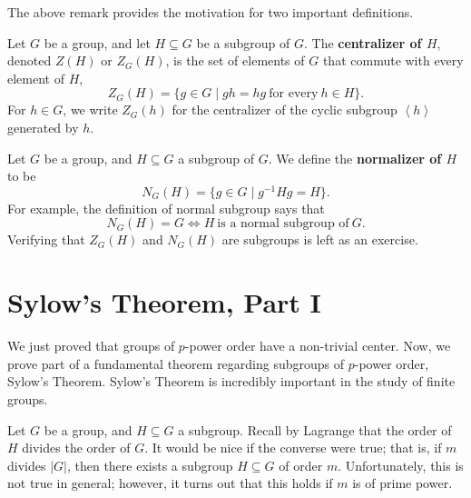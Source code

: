 \documentclass[math1530-lecture-notes]{subfiles}
\begin{document}
The above remark provides the motivation for two important definitions.
\begin{definition}[Centralizer]{}
  Let $G$ be a group, and let $H\subseteq G$ be a subgroup of $G$. The \textbf{centralizer of $H$},
  denoted $Z(H)$ or $Z_G(H)$, is the set of elements of $G$ that commute with every element of $H$,
  \[
    Z_G(H)=\{g\in G\mid gh=hg~\text{for every}~h\in H\} 
  .\] For $h\in G$, we write $Z_G(h)$ for the centralizer of the cyclic subgroup $\left<h \right>$
  generated by $h$.
\end{definition}
\begin{definition}[Normalizer]{}
  Let $G$ be a group, and $H\subseteq G$ a subgroup of $G$. We define the \textbf{normalizer of $H$}
  to be \[
    N_G(H)=\{g\in G\mid g^{-1}Hg=H\} 
  .\] For example, the definition of normal subgroup says that \[
    N_G(H)=G \iff H ~\text{is a normal subgroup of}~G
  .\] Verifying that $Z_G(H)$ and $N_G(H)$ are subgroups is left as an exercise.
\end{definition}


\section{Sylow's Theorem, Part I}

We just proved that groups of $p$-power order have a non-trivial center. Now, we prove part of a
fundamental theorem regarding subgroups of $p$-power order, Sylow's Theorem. Sylow's Theorem is
incredibly important in the study of finite groups.

Let $G$ be a group, and $H\subseteq G$ a subgroup. Recall by Lagrange that the order of $H$ divides
the order of $G$. It would be nice if the converse were true; that is, if $m$ divides $\left| G
\right| $, then there exists a subgroup $H\subseteq G$ of order $m$. Unfortunately, this is not true
in general; however, it turns out that this holds if $m$ is of prime power.
\end{document}
